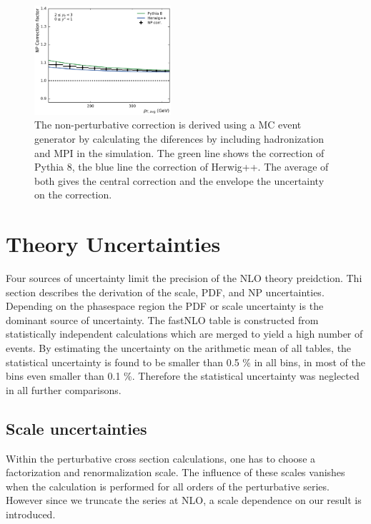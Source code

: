 \begin{figure}[htp]
    \includegraphics[width=0.45\textwidth]{figures/theory/np_factors_calc_yb2ys0.pdf}
    \caption{The non-perturbative correction is derived using a MC event
        generator by calculating the diferences by including hadronization and
        MPI in the simulation. The green line shows the correction of Pythia 8,
        the blue line the correction of Herwig++. The average of both gives the
        central correction and the envelope the uncertainty on the correction.}
    \label{fig:np_factors}
\end{figure}

\section{Theory Uncertainties}

Four sources of uncertainty limit the precision of the NLO theory preidction.
Thi section describes the derivation of the scale, PDF, \as and NP
uncertainties. Depending on the phasespace region the PDF or scale uncertainty
is the dominant source of uncertainty. The fastNLO table is
constructed from statistically independent calculations which are merged to
yield a high number of events. By estimating the uncertainty on the arithmetic
mean of all tables, the statistical uncertainty is found to be smaller than 0.5
\% in all bins, in most of the bins even smaller than 0.1 \%. Therefore the
statistical uncertainty was neglected in all further comparisons.

\subsection{Scale uncertainties}

Within the perturbative cross section calculations, one has to choose a
factorization and renormalization scale. The influence of these scales vanishes
when the calculation is performed for all orders of the perturbative series.
However since we truncate the series at NLO, a scale dependence on our result is
introduced. 

